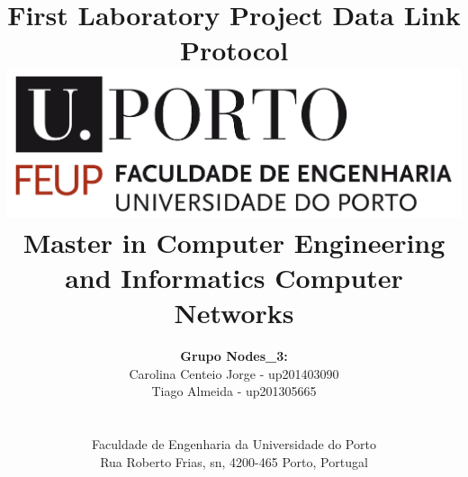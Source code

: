 \documentclass[a4paper]{article}
\begin{document}

\renewcommand{\figurename}{Fig.}

\setlength{\textwidth}{16cm}
\setlength{\textheight}{22cm}

\title{\Huge\textbf{First Laboratory Project}\linebreak\linebreak\linebreak
\Large\textbf{Data Link Protocol}\linebreak\linebreak
\linebreak\linebreak
\includegraphics[scale=0.1]{feup-logo.png}\linebreak\linebreak
\linebreak\linebreak
\Large{Master in Computer Engineering and Informatics} \linebreak\linebreak
\Large{Computer Networks}\linebreak
}

\author{\textbf{Grupo Nodes\_3:}\\
Carolina Centeio Jorge - up201403090 \\
Tiago Almeida - up201305665 \\
\linebreak\linebreak \\
 \\ Faculdade de Engenharia da Universidade do Porto \\ Rua Roberto Frias, s\/n, 4200-465 Porto, Portugal \linebreak\linebreak\linebreak
\linebreak\linebreak\vspace{1cm}}
\end{document}
